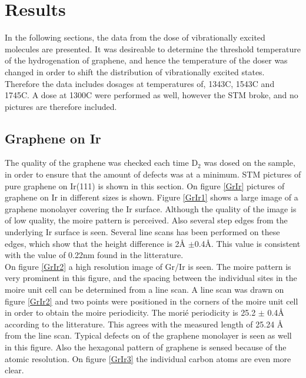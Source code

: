 \chapter{Results}
\label{cha:results}
In the following sections, the data from the dose of vibrationally excited molecules are presented. It was desireable to determine the threshold temperature of the hydrogenation of graphene, and hence the temperature of the doser was changed in order to shift the distribution of vibrationally excited states. Therefore the data includes dosages at temperatures of, 1343\degree C, 1543\degree C and 1745\degree C. A dose at 1300\degree C were performed as well, however the STM broke, and no pictures are therefore included.

\section{Graphene on Ir}

The quality of the graphene was checked each time D$_2$ was dosed on the sample, in order to ensure that the amount of defects was at a minimum. STM pictures of pure graphene on Ir(111) is shown in this section. On figure \ref{GrIr} pictures of graphene on Ir in different sizes is shown. Figure \ref{GrIr1} shows a large image of a graphene monolayer covering the Ir surface. Although the quality of the image is of low quality, the moire pattern is perceived. Also several step edges from the underlying Ir surface is seen. Several line scans has been performed on these edges, which show that the height difference is 2Å $\pm$0.4Å. This value is consistent with the value of 0.22nm found in the litterature.\cite{1367-2630-11-2-023006}\\
On figure \ref{GrIr2} a high resolution image of Gr/Ir is seen. The moire pattern is very prominent in this figure, and the spacing between the individual sites in the moire unit cell can be determined from a line scan. A line scan was drawn on figure \ref{GrIr2} and two points were positioned in the corners of the moire unit cell in order to obtain the moire periodicity. The morié periodicity is 25.2 $\pm$ 0.4Å according to the litterature.\cite{1367-2630-10-4-043033} This agrees with the measured length of 25.24 Å from the line scan. Typical defects on of the graphene monolayer is seen as well in this figure. Also the hexagonal pattern of graphene is sensed because of the atomic resolution. On figure \ref{GrIr3} the individual carbon atoms are even more clear.\\

